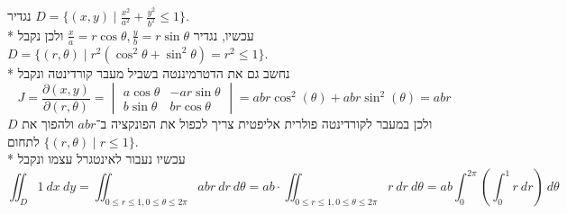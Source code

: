 



נגדיר $D = \{ (x, y) \mid \frac{x^2}{a^2} + \frac{y^2}{b^2} \le 1 \}$. \\*
עכשיו, נגדיר $\frac{x}{a} = r \cos \theta, \frac{y}{b} = r \sin \theta$ ולכן נקבל $D = \{ (r, \theta) \mid r^2 (\cos^2 \theta + \sin^2 \theta) = r^2 \le 1 \}$. \\*
נחשב גם את הדטרמיננטה בשביל מעבר קורדינטה ונקבל
\[
	J = \frac{\partial (x, y)}{\partial (r, \theta)}
	= \begin{vmatrix}
		a \cos \theta & -ar \sin \theta \\
		b \sin \theta & br \cos \theta
	\end{vmatrix}
	= ab r \cos^2(\theta) + ab r \sin^2(\theta) = ab r
\]
ולכן במעבר לקורדינטה פולרית אליפטית צריך לכפול את הפונקציה ב־$ab r$ ולהפוך את $D$ לתחום $\{ (r, \theta) \mid r \le 1 \}$. \\*
עכשיו נעבור לאינטגרל עצמו ונקבל
\[
	\iint_D 1\ dx\ dy
	= \iint_{0 \le r \le 1, 0 \le \theta \le 2\pi} ab r\ dr\ d\theta
	= ab \cdot \iint_{0 \le r \le 1, 0 \le \theta \le 2\pi} r\ dr\ d\theta
	= ab \int_0^{2\pi} \left( \int_0^1 r\ dr \right)\ d\theta
\]


